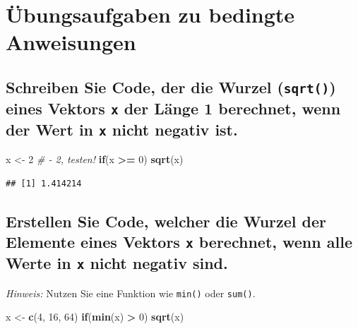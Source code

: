 \documentclass[12pt,a4paper]{article}
\newenvironment{Shaded}{\begin{snugshade}}{\end{snugshade}}
\newcommand{\CommentTok}[1]{\textcolor[rgb]{0.56,0.35,0.01}{\textit{#1}}}
\newcommand{\ControlFlowTok}[1]{\textcolor[rgb]{0.13,0.29,0.53}{\textbf{#1}}}
\newcommand{\DecValTok}[1]{\textcolor[rgb]{0.00,0.00,0.81}{#1}}
\newcommand{\FunctionTok}[1]{\textcolor[rgb]{0.13,0.29,0.53}{\textbf{#1}}}
\newcommand{\NormalTok}[1]{#1}
\newcommand{\OtherTok}[1]{\textcolor[rgb]{0.56,0.35,0.01}{#1}}
\newcommand{\SpecialCharTok}[1]{\textcolor[rgb]{0.81,0.36,0.00}{\textbf{#1}}}
\begin{document}
\section{Übungsaufgaben zu bedingte
Anweisungen}\label{uxfcbungsaufgaben-zu-bedingte-anweisungen}

\subsection{\texorpdfstring{Schreiben Sie Code, der die Wurzel
(\texttt{sqrt()}) eines Vektors \texttt{x} der Länge 1 berechnet, wenn
der Wert in \texttt{x} nicht negativ
ist.}{Schreiben Sie Code, der die Wurzel () eines Vektors  der Länge 1 berechnet, wenn der Wert in  nicht negativ ist.}}\label{schreiben-sie-code-der-die-wurzel-eines-vektors-der-luxe4nge-1-berechnet-wenn-der-wert-in-nicht-negativ-ist.}

\begin{Shaded}
\begin{Highlighting}[]
\NormalTok{    x }\OtherTok{\textless{}{-}} \DecValTok{2} \CommentTok{\# {-} 2, testen!}
    \ControlFlowTok{if}\NormalTok{(x }\SpecialCharTok{\textgreater{}=} \DecValTok{0}\NormalTok{) }\FunctionTok{sqrt}\NormalTok{(x)}
\end{Highlighting}
\end{Shaded}

\begin{verbatim}
## [1] 1.414214
\end{verbatim}

\subsection{\texorpdfstring{Erstellen Sie Code, welcher die Wurzel der
Elemente eines Vektors \texttt{x} berechnet, wenn alle Werte in
\texttt{x} nicht negativ
sind.}{Erstellen Sie Code, welcher die Wurzel der Elemente eines Vektors  berechnet, wenn alle Werte in  nicht negativ sind.}}\label{erstellen-sie-code-welcher-die-wurzel-der-elemente-eines-vektors-berechnet-wenn-alle-werte-in-nicht-negativ-sind.}

\emph{Hinweis:} Nutzen Sie eine Funktion wie \texttt{min()} oder
\texttt{sum()}.

\begin{Shaded}
\begin{Highlighting}[]
\NormalTok{    x }\OtherTok{\textless{}{-}} \FunctionTok{c}\NormalTok{(}\DecValTok{4}\NormalTok{, }\DecValTok{16}\NormalTok{, }\DecValTok{64}\NormalTok{)}
    \ControlFlowTok{if}\NormalTok{(}\FunctionTok{min}\NormalTok{(x) }\SpecialCharTok{\textgreater{}} \DecValTok{0}\NormalTok{) }\FunctionTok{sqrt}\NormalTok{(x)}
\end{Highlighting}
\end{Shaded}
\end{document}
